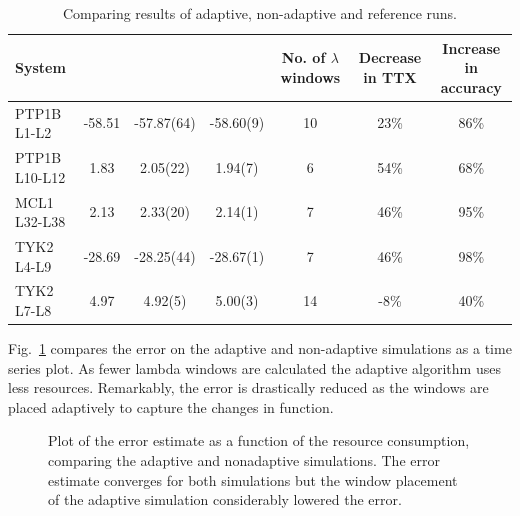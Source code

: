 \begin{table}
  \caption{Comparing results of adaptive, non-adaptive and reference
  runs.}\label{tab:adapquad}
  \begin{tabular}{lSSSSS[table-format=5.1]S[table-format=5.1]}
    \toprule
    {System}                               & 
    {}  &
    {}       &
    {}           &
    {No. of $\lambda$ windows}            &
    {Decrease in TTX}       &
    {Increase in accuracy}                 \\
    \midrule
    {PTP1B L1-L2}   & 
    -58.51 & 
    -57.87(64) & 
    -58.60(9) & 
    10 & 
    23\si{\percent} & 
    86\si{\percent} \\
    {PTP1B L10-L12} & 
    1.83   & 
    2.05(22) & 
    1.94(7)  & 
    6  & 
    54\si{\percent} &
    68\si{\percent} \\
    {MCL1  L32-L38} & 
    2.13   & 
    2.33(20) & 
    2.14(1)      & 
    7  & 
    46\si{\percent} & 
    95\si{\percent} \\
    {TYK2  L4-L9}   &
    -28.69 & 
    -28.25(44) & 
    -28.67(1)  & 
    7  & 
    46\si{\percent} & 
    98\si{\percent} \\
    {TYK2  L7-L8}   & 
    4.97   & 
    4.92(5) & 
    5.00(3)      & 
    14 &  
    -8\si{\percent} & 
    40\si{\percent} \\
    \bottomrule 
  \end{tabular}
\end{table}

Fig.~\ref{fig:adapconv} compares the error on the adaptive and non-adaptive
simulations as a time series plot. As fewer lambda windows are calculated the
adaptive algorithm uses less resources. Remarkably, the error is drastically
reduced as the windows are placed adaptively to capture the changes in
function.

\begin{figure}
  
  \caption{Plot of the error estimate as a function of the resource
  consumption, comparing the adaptive and nonadaptive simulations. The error
  estimate converges for both simulations but the window placement of the
  adaptive simulation considerably lowered the error.}\label{fig:adapconv}
\up{}
\up{}
\end{figure}

